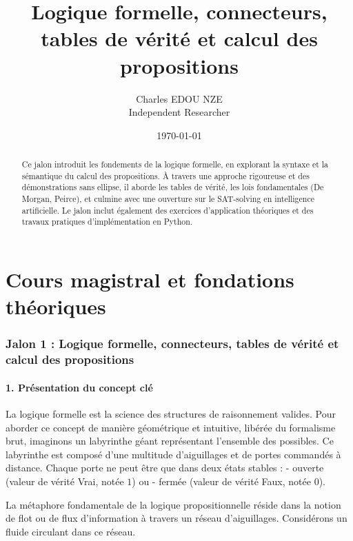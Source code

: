 \documentclass[11pt,a4paper]{article}
\title{Logique formelle, connecteurs, tables de vérité et calcul des propositions}
\author{Charles EDOU NZE \\ \small Independent Researcher}
\date{\today}
\begin{document}
\maketitle

\begin{abstract}
Ce jalon introduit les fondements de la logique formelle, en explorant la syntaxe et la sémantique du calcul des propositions. À travers une approche rigoureuse et des démonstrations sans ellipse, il aborde les tables de vérité, les lois fondamentales (De Morgan, Peirce), et culmine avec une ouverture sur le SAT-solving en intelligence artificielle. Le jalon inclut également des exercices d'application théoriques et des travaux pratiques d'implémentation en Python.
\end{abstract}

\tableofcontents
\newpage

\part{Cours magistral et fondations théoriques}
\hypertarget{jalon-1-logique-formelle-connecteurs-tables-de-vuxe9rituxe9-et-calcul-des-propositions}{%
\section{Jalon 1 : Logique formelle, connecteurs, tables de vérité et
calcul des
propositions}\label{jalon-1-logique-formelle-connecteurs-tables-de-vuxe9rituxe9-et-calcul-des-propositions}}

\hypertarget{pruxe9sentation-du-concept-cluxe9}{%
\subsection{1. Présentation du concept
clé}\label{pruxe9sentation-du-concept-cluxe9}}

La logique formelle est la science des structures de raisonnement
valides. Pour aborder ce concept de manière géométrique et intuitive,
libérée du formalisme brut, imaginons un labyrinthe géant représentant
l'ensemble des possibles. Ce labyrinthe est composé d'une multitude
d'aiguillages et de portes commandés à distance. Chaque porte ne peut
être que dans deux états stables : - ouverte (valeur de vérité Vrai,
notée \(1\)) ou - fermée (valeur de vérité Faux, notée \(0\)).

La métaphore fondamentale de la logique propositionnelle réside dans la
notion de flot ou de flux d'information à travers un réseau
d'aiguillages. Considérons un fluide circulant dans ce réseau.
\end{document}
